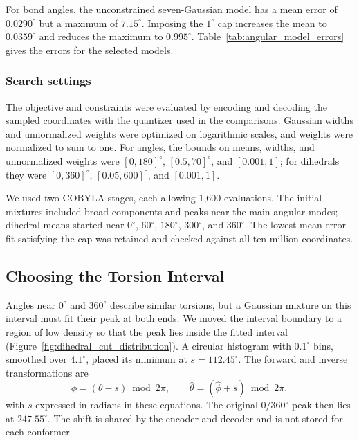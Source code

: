 \documentclass[%
 preprint,
superscriptaddress,
 amsmath,amssymb,
 aip,
 jcp,
]{revtex4-2}
\begin{document}
For bond angles, the unconstrained seven-Gaussian model has a mean error of $0.0290^\circ$ but a maximum of $7.15^\circ$.
Imposing the $1^\circ$ cap increases the mean to $0.0359^\circ$ and reduces the maximum to $0.995^\circ$.
Table~\ref{tab:angular_model_errors} gives the errors for the selected models.

\subsubsection{Search settings}

The objective and constraints were evaluated by encoding and decoding the sampled coordinates with the quantizer used in the comparisons.
Gaussian widths and unnormalized weights were optimized on logarithmic scales, and weights were normalized to sum to one.
For angles, the bounds on means, widths, and unnormalized weights were $[0,180]^\circ$, $[0.5,70]^\circ$, and $[0.001,1]$; for dihedrals they were $[0,360]^\circ$, $[0.05,600]^\circ$, and $[0.001,1]$.

We used two COBYLA stages, each allowing 1,600 evaluations.
The initial mixtures included broad components and peaks near the main angular modes; dihedral means started near $0^\circ$, $60^\circ$, $180^\circ$, $300^\circ$, and $360^\circ$.
The lowest-mean-error fit satisfying the cap was retained and checked against all ten million coordinates.

\subsection{Choosing the Torsion Interval}

Angles near $0^\circ$ and $360^\circ$ describe similar torsions, but a Gaussian mixture on this interval must fit their peak at both ends.
We moved the interval boundary to a region of low density so that the peak lies inside the fitted interval (Figure~\ref{fig:dihedral_cut_distribution}).
A circular histogram with $0.1^\circ$ bins, smoothed over $4.1^\circ$, placed its minimum at $s=112.45^\circ$.
The forward and inverse transformations are
\begin{equation}
 \phi=(\theta-s)\bmod 2\pi,\qquad
 \widehat{\theta}=(\widehat{\phi}+s)\bmod 2\pi,
 \label{eq:dihedral_shift}
\end{equation}
with $s$ expressed in radians in these equations.
The original $0/360^\circ$ peak then lies at $247.55^\circ$.
The shift is shared by the encoder and decoder and is not stored for each conformer.
\end{document}
